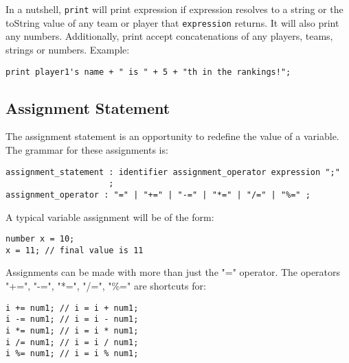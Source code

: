 In a nutshell, \texttt{print} will print expression if expression
resolves to a string or the toString value of any team or player that
\texttt{expression} returns. It will also print any
numbers. Additionally, print accept concatenations of any players,
teams, strings or numbers. Example:

\begin{verbatim}
print player1's name + " is " + 5 + "th in the rankings!";
\end{verbatim}

\subsection{Assignment Statement}
The assignment statement is an opportunity to redefine the value of a
variable. The grammar for these assignments is:

\begin{verbatim}
assignment_statement : identifier assignment_operator expression ";"
                     ;
assignment_operator : "=" | "+=" | "-=" | "*=" | "/=" | "%=" ;
\end{verbatim}

A typical variable assignment will be of the form:

\begin{verbatim}
number x = 10;
x = 11; // final value is 11
\end{verbatim}

Assignments can be made with more than just the "=" operator. The
operators "+=", "-=", "*=", "/=", "\%=" are shortcuts for:

\begin{verbatim}
i += num1; // i = i + num1;
i -= num1; // i = i - num1;
i *= num1; // i = i * num1;
i /= num1; // i = i / num1;
i %= num1; // i = i % num1;
\end{verbatim}
 
